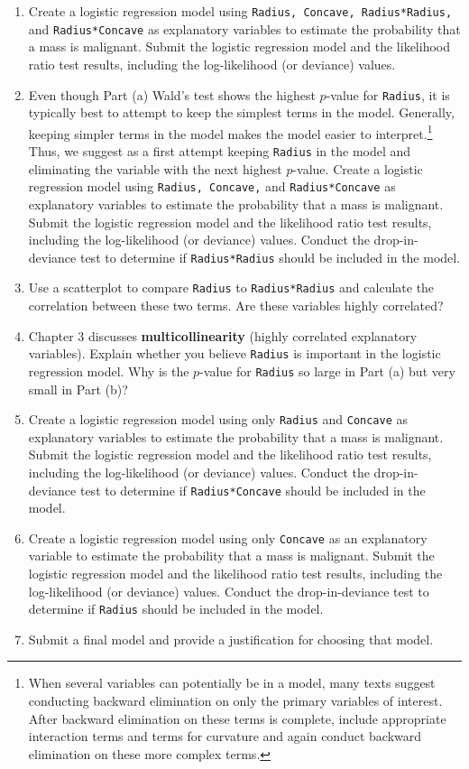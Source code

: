 \documentclass[
]{report}
\begin{document}
\begin{list}{E..}{ \setlength{\itemsep}{1.2em}}
  \begin{enumerate}
    \item Create a logistic regression model using \texttt{Radius, Concave, Radius*Radius,} and \texttt{Radius*Concave} as explanatory variables to estimate the probability that a mass is malignant. Submit the logistic regression model and the likelihood ratio test results, including the log-likelihood (or deviance) values.
    \item Even though Part (a) Wald’s test shows the highest $p$-value for \texttt{Radius}, it is typically best to attempt to keep the simplest terms in the model. Generally, keeping simpler terms in the model makes the model easier to interpret.\footnote{When several variables can potentially be in a model, many texts suggest conducting backward elimination on only the primary variables of interest. After backward elimination on these terms is complete, include appropriate interaction terms and terms for curvature and again conduct backward elimination on these more complex terms.} Thus, we suggest as a first attempt keeping \texttt{Radius} in the model and eliminating the variable with the next highest $p$-value. Create a logistic regression model using \texttt{Radius, Concave,} and \texttt{Radius*Concave} as explanatory variables to estimate the probability that a mass is malignant. Submit the logistic regression model and the likelihood ratio test results, including the log-likelihood (or deviance) values. Conduct the drop-in-deviance test to determine if \texttt{Radius*Radius} should be included in the model.
    \item Use a scatterplot to compare \texttt{Radius} to \texttt{Radius*Radius} and calculate the correlation between these two terms. Are these variables highly correlated?
    \item Chapter 3 discusses \textbf{multicollinearity} (highly correlated explanatory variables). Explain whether you believe \texttt{Radius} is important in the logistic regression model. Why is the $p$-value for \texttt{Radius} so large in Part (a) but very small in Part (b)?
    \item Create a logistic regression model using only \texttt{Radius} and \texttt{Concave} as explanatory variables to estimate the probability that a mass is malignant. Submit the logistic regression model and the likelihood ratio test results, including the log-likelihood (or deviance) values. Conduct the drop-in-deviance test to determine if \texttt{Radius*Concave} should be included in the model.
    \item Create a logistic regression model using only \texttt{Concave} as an explanatory variable to estimate the probability that a mass is malignant. Submit the logistic regression model and the likelihood ratio test results, including the log-likelihood (or deviance) values. Conduct the drop-in-deviance test to determine if \texttt{Radius} should be included in the model.
    \item Submit a final model and provide a justification for choosing that model.
  \end{enumerate}


\end{list}
\end{document}

